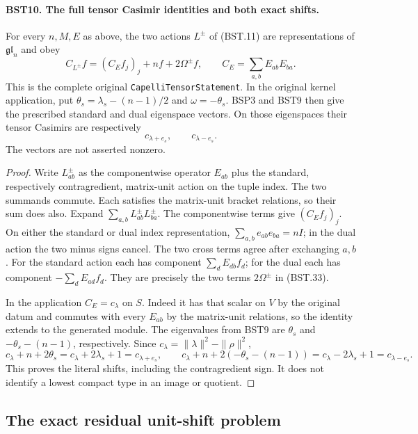 \documentclass[11pt,a4paper]{article}
\numberwithin{equation}{section}
\theoremstyle{remark}\newtheorem{remark}[theorem]{Remark}
\begin{document}
\paragraph{BST10. The full tensor Casimir identities and both exact shifts.}
\label{claim:BST10}
For every $n,M,E$ as above, the two actions $L^\pm$ of (BST.11)
are representations of $\mathfrak{gl}_n$ and obey
\[
 C_{L^\pm}f=(C_Ef_j)_j+n f+2\Omega^\pm f,
 \qquad C_E=\sum_{a,b}E_{ab}E_{ba}.
 \tag{BST.33}
\]
This is the complete original \texttt{Capelli\allowbreak Tensor\allowbreak Statement}.
In the original kernel application, put
$\theta_s=\lambda_s-(n-1)/2$ and $\omega=-\theta_s$.
BSP3 and BST9 then give the prescribed standard and dual
eigenspace vectors.  On those eigenspaces their tensor Casimirs are
respectively
\[
                 c_{\lambda+e_s},\qquad c_{\lambda-e_s}.
 \tag{BST.34}
\]
The vectors are not asserted nonzero.

\begin{proof}
Write $L^\pm_{ab}$ as the componentwise operator $E_{ab}$ plus
the standard, respectively contragredient, matrix-unit action on
the tuple index.  The two summands commute.  Each satisfies the
matrix-unit bracket relations, so their sum does also.
Expand $\sum_{a,b}L^\pm_{ab}L^\pm_{ba}$.
The componentwise terms give $(C_Ef_j)_j$.
On either the standard or dual index representation,
$\sum_{a,b}e_{ab}e_{ba}=nI$; in the dual action the two minus
signs cancel.  The two cross terms agree after exchanging $a,b$.
For the standard action each has component
$\sum_dE_{db}f_d$; for the dual each has component
$-\sum_dE_{ad}f_d$.  They are precisely the two terms
$2\Omega^\pm$ in (BST.33).

In the application $C_E=c_\lambda$ on $S$.
Indeed it has that scalar on $V$ by the original datum and commutes
with every $E_{ab}$ by the matrix-unit relations, so the identity
extends to the generated module.
The eigenvalues from BST9 are
$\theta_s$ and $-\theta_s-(n-1)$, respectively.
Since $c_\lambda=\|\lambda\|^2-\|\rho\|^2$,
\[
 c_\lambda+n+2\theta_s=c_\lambda+2\lambda_s+1
        =c_{\lambda+e_s},\qquad
 c_\lambda+n+2(-\theta_s-(n-1))
        =c_\lambda-2\lambda_s+1=c_{\lambda-e_s}.
 \tag{BST.35}
\]
This proves the literal shifts, including the contragredient sign.
It does not identify a lowest compact type in an image or quotient.
\end{proof}

\subsection{The exact residual unit-shift problem}
\end{document}
